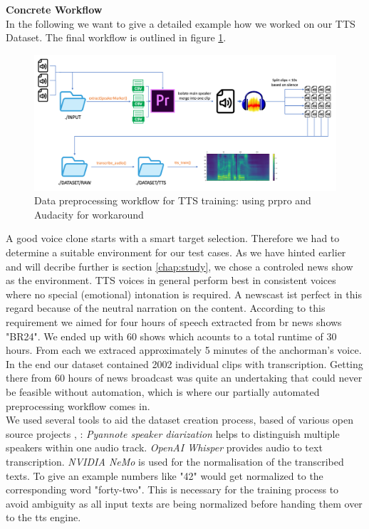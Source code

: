 \documentclass[
  a4paper,  %
  twoside,  %
  bibliography=totoc,
  headsepline,
  cleardoublepage=empty,
  parskip=half,
  draft=false
]{scrbook}
\begin{document}
\textbf{Concrete Workflow} \\
In the following we want to give a detailed example how we worked on our TTS Dataset. The final workflow is outlined in figure \ref{fig:dvt-tts-wf}.
\begin{figure}[h]
  \centering
  \includegraphics[width=1\textwidth]{./graphics/images/tts/tts prpro.png}
  \caption{Data preprocessing workflow for TTS training: using \gls{prpro} and Audacity for workaround}
  \label{fig:dvt-tts-wf}
\end{figure}
A good voice clone starts with a smart target selection. Therefore we had to determine a suitable environment for our test cases. As we have hinted earlier and will decribe further is section \ref{chap:study}, we chose a controled news show as the environment. TTS voices in general perform best in consistent voices where no special (emotional) intonation is required. A newscast ist perfect in this regard because of the neutral narration on the content. 
According to this requirement we aimed for four hours of speech extracted from \gls{br} news shows "BR24". We ended up with 60 shows which acounts to a total runtime of 30 hours. From each we extraced approximately 5 minutes of the anchorman's voice.\\
In the end our dataset contained 2002 individual clips with transcription. Getting there from 60 hours of news broadcast was quite an undertaking that could never be feasible without automation, which is where our partially automated preprocessing workflow comes in. \\
We used several tools to aid the dataset creation process, based of various open source projects \cite{micaAudioSplitterUsing2023}, \cite{harperEndtoEndToolkitVoice2023}: \textit{Pyannote speaker diarization} helps to distinguish multiple speakers within one audio track. \textit{OpenAI Whisper} provides audio to text transcription. \textit{NVIDIA NeMo} is used for the normalisation of the transcribed texts. To give an example numbers like "42" would get normalized to the corresponding word "forty-two". This is necessary for the training process to avoid ambiguity as all input texts are being normalized before handing them over to the \gls{tts} engine. \\
\end{document}
